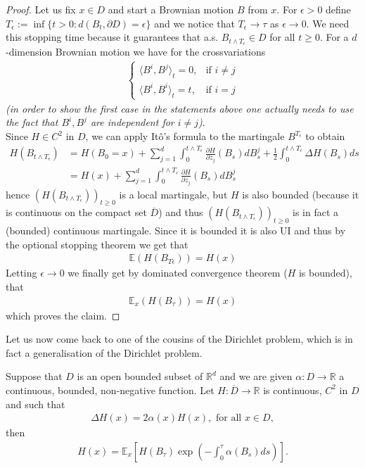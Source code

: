 \documentclass[../mainfile.tex]{subfiles}
\begin{document}
\begin{proof}
Let us fix $x \in D$ and start a Brownian motion $B$ from $x$. For $\epsilon >0$ define $T_\epsilon:= \inf \{ t>0 : d(B_t, \partial D) = \epsilon \}$ and we notice that $T_\epsilon \to \tau$ as $\epsilon \to 0$. We need this stopping time because it guarantees that a.s. $B_{t \wedge T_\epsilon} \in D$ for all $t \geq 0$. For a $d$-dimension Brownian motion we have for the crossvariations
\begin{align*}
\begin{cases} \langle B^i,  B^j \rangle_t =0, & \text{if } i \neq j \\
\langle B^i, B^i \rangle_t =t, & \text{if } i=j \end{cases}
\end{align*}
\textit{(in order to show the first case in the statements above one actually needs to use the fact that $B^i, B^j$ are independent for $i \neq j$)}.\\
Since $H \in C^2$ in $D$, we can apply Itô's formula to the martingale $B^{T_\epsilon}$ to obtain 
\begin{align*}
H(B_{t \wedge T_\epsilon}) &= H(B_0=x)+ \sum_{j=1}^d \int_0^{t \wedge T_\epsilon} \frac{\partial H}{\partial z_j}(B_s)dB_s^j + \frac{1}{2} \int_0^{t \wedge T_\epsilon} \Delta H(B_s)ds \\
&= H(x) + \sum_{j=1}^d \int_0^{t \wedge T_\epsilon} \frac{\partial H}{\partial z_j}(B_s)dB_s^j
\end{align*}
hence $(H(B_{t \wedge T_\epsilon}))_{t \geq 0}$ is a local martingale, but $H$ is also bounded (because it is continuous on the compact set $\overline{D}$) and thus $(H(B_{t \wedge T_\epsilon}))_{t \geq 0}$ is in fact a (bounded) continuous martingale. Since it is bounded it is also UI and thus by the optional stopping theorem we get that 
\begin{align*}
\mathbb{E}(H(B_{T \epsilon}))= H(x)
\end{align*}
Letting $\epsilon \to 0$ we finally get by dominated convergence theorem ($H$ is bounded), that 
\begin{align*}
\mathbb{E}_x(H(B_\tau))=H(x)
\end{align*}
which proves the claim.
\end{proof}
\newpage
Let us now come back to one of the cousins of the Dirichlet problem, which is in fact a generalisation of the Dirichlet problem.
\begin{prop} Suppose that $D$ is an open bounded subset of $\mathbb{R}^d$ and we are given $\alpha: D \to \mathbb{R}$ a continuous, bounded, non-negative function. Let $H: \overline{D} \to \mathbb{R}$ is continuous, $C^2$ in $D$ and such that 
\begin{align*}
\Delta H(x) = 2 \alpha (x) H(x), \text{ for all } x \in D,
\end{align*}
then
\begin{align*}
H(x)= \mathbb{E}_x\left[ H(B_\tau) \exp \left(- \int_0^\tau \alpha (B_s)ds\right) \right].
\end{align*}
\end{prop}
\end{document}
